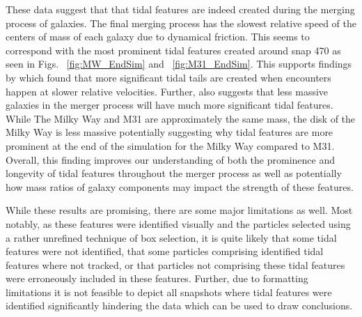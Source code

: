 \documentclass[fleqn,usenatbib]{mnras}
\begin{document}
These data suggest that that tidal features are indeed created during the merging process of galaxies. The final merging process has the slowest relative speed of the centers of mass of each galaxy due to dynamical friction. This seems to correspond with the most prominent tidal features created around snap 470 as seen in Figs. ~\ref{fig:MW_EndSim} and ~\ref{fig:M31_EndSim}. This supports findings by \cite{Ji_Peirani_Yi_2014} which found that more significant tidal tails are created when encounters happen at slower relative velocities. Further, \cite{Ji_Peirani_Yi_2014} also suggests that less massive galaxies in the merger process will have much more significant tidal features. While The Milky Way and M31 are approximately the same mass, the disk of the Milky Way is less massive potentially suggesting why tidal features are more prominent at the end of the simulation for the Milky Way compared to M31. Overall, this finding improves our understanding of both the prominence and longevity of tidal features throughout the merger process as well as potentially how mass ratios of galaxy components may impact the strength of these features.

While these results are promising, there are some major limitations as well. Most notably, as these features were identified visually and the particles selected using a rather unrefined technique of box selection, it is quite likely that some tidal features were not identified, that some particles comprising identified tidal features where not tracked, or that particles not comprising these tidal features were erroneously included in these features. Further, due to formatting limitations it is not feasible to depict all snapshots where tidal features were identified significantly hindering the data which can be used to draw conclusions.
\end{document}
